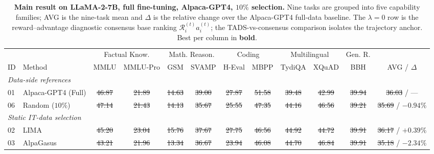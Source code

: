 \begin{table}[t]
\centering
\caption{\textbf{Main result on LLaMA-2-7B, full fine-tuning,
Alpaca-GPT4, $10\%$ selection.} Nine tasks are grouped into five
capability families; AVG is the nine-task mean and $\Delta$ is the
relative change over the Alpaca-GPT4 full-data baseline. The
$\lambda=0$ row is the reward--advantage diagnostic consensus base
ranking $\mathcal{R}_i^{(t)}a_i^{(t)}$; the
\textsc{TADS}-vs-consensus comparison isolates the trajectory
anchor. Best per column in \textbf{bold}. }
\label{tab:main}
\small
\setlength{\tabcolsep}{4pt}
\begin{tabular}{llcccccccccc}
\toprule
 & & \multicolumn{2}{c}{Factual Know.}
   & \multicolumn{2}{c}{Math. Reason.}
   & \multicolumn{2}{c}{Coding}
   & \multicolumn{2}{c}{Multilingual}
   & Gen. R. & \\
\cmidrule(lr){3-4}\cmidrule(lr){5-6}\cmidrule(lr){7-8}\cmidrule(lr){9-10}\cmidrule(lr){11-11}
ID & Method & MMLU & MMLU-Pro & GSM & SVAMP & H-Eval & MBPP
   & TydiQA & XQuAD & BBH & AVG / $\Delta$ \\
\midrule
\multicolumn{12}{l}{\textit{Data-side references}}\\
01 & Alpaca-GPT4 (Full) 
& \sout{46.87} & \sout{21.89} & \sout{14.63} & \sout{39.00} 
& \sout{27.87} & \sout{51.58} & \sout{39.48} & \sout{42.99} 
& \sout{39.94} & \sout{36.03} / --- \\

06 & Random ($10\%$)    
& \sout{47.14} & \sout{21.43} & \sout{14.13} & \sout{35.67} 
& \sout{25.55} & \sout{47.35} & \sout{44.16} & \sout{46.56} 
& \sout{39.21} & \sout{35.69} / \sout{$-0.94\%$} \\

\midrule
\multicolumn{12}{l}{\textit{Static IT-data selection}}\\
02 & LIMA               
& \sout{45.20} & \sout{23.04} & \sout{15.76} & \sout{37.67} 
& \sout{27.75} & \sout{46.56} & \sout{44.92} & \sout{44.72} 
& \sout{39.91} & \sout{36.17} / \sout{$+0.39\%$} \\

03 & AlpaGasus          
& \sout{43.21} & \sout{21.96} & \sout{13.34} & \sout{36.67} 
& \sout{23.94} & \sout{46.08} & \sout{44.70} & \sout{46.84} 
& \sout{39.91} & \sout{35.18} / \sout{$-2.34\%$} \\


\end{tabular}
\end{table}
